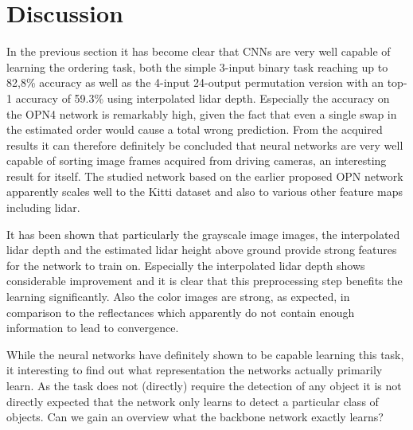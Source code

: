 %
\newpage
\chapter{Discussion}
\label{ch:discussion}
In the previous section it has become clear that CNNs are very well capable of learning the ordering task, both the simple 3-input binary task reaching up to 82,8\% accuracy as well as the 4-input 24-output permutation version with an top-1 accuracy of 59.3\% using interpolated lidar depth. Especially the accuracy on the OPN4 network is remarkably high, given the fact that even a single swap in the estimated order would cause a total wrong prediction. From the acquired results it can therefore definitely be concluded that neural networks are very well capable of sorting image frames acquired from driving cameras, an interesting result for itself. The studied network based on the earlier proposed OPN network \cite{lee2017} apparently scales well to the Kitti dataset and also to various other feature maps including lidar.

It has been shown that particularly the grayscale image images, the interpolated lidar depth and the estimated lidar height above ground provide strong features for the network to train on. Especially the interpolated lidar depth shows considerable improvement and it is clear that this preprocessing step benefits the learning significantly. Also the color images are strong, as expected, in comparison to the reflectances which apparently do not contain enough information to lead to convergence.


While the neural networks have definitely shown to be capable learning this task, it interesting to find out what representation the networks actually primarily learn. As the task does not (directly) require the detection of any object it is not directly expected that the network only learns to detect a particular class of objects. Can we gain an overview what the backbone network exactly learns? 

